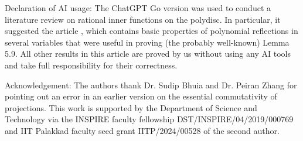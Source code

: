 \documentclass[12pt, a4 paper]{amsart}
\theoremstyle{definition}
\theoremstyle{plain}
\theoremstyle{definition}
\numberwithin{equation}{section}
\let\phi=\varphi
\begin{document}
\smallskip
\noindent\textsf{Declaration of AI usage:} The ChatGPT Go version was used to conduct a literature review on rational inner functions on the polydisc. In particular, it suggested the article \cite{AJMJES}, which contains basic properties of polynomial reflections in several variables that were useful in proving (the probably well-known) Lemma 5.9. All other results in this article are proved by us without using any AI tools and take full responsibility for their correctness.
\smallskip

\noindent\textsf{Acknowledgement:} The authors thank Dr. Sudip Bhuia and Dr. Peiran Zhang for pointing out an error in an earlier version on the essential commutativity of projections. This work is supported by the Department of Science and Technology via the INSPIRE faculty fellowship DST/INSPIRE/04/2019/000769 and IIT Palakkad faculty seed grant IITP/2024/00528 of the second author.
\end{document}
